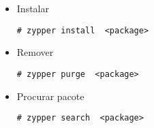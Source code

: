 \begin{itemize}
	\item Instalar
	\begin{lstlisting}[numbers=none,commentstyle=\color{black}]
	# zypper install  <package>
	\end{lstlisting}
	\item Remover
	\begin{lstlisting}[numbers=none,commentstyle=\color{black}]
	# zypper purge  <package>
	\end{lstlisting}
	\item Procurar pacote
	\begin{lstlisting}[numbers=none,commentstyle=\color{black}]
	# zypper search  <package>
	\end{lstlisting}
\end{itemize}
